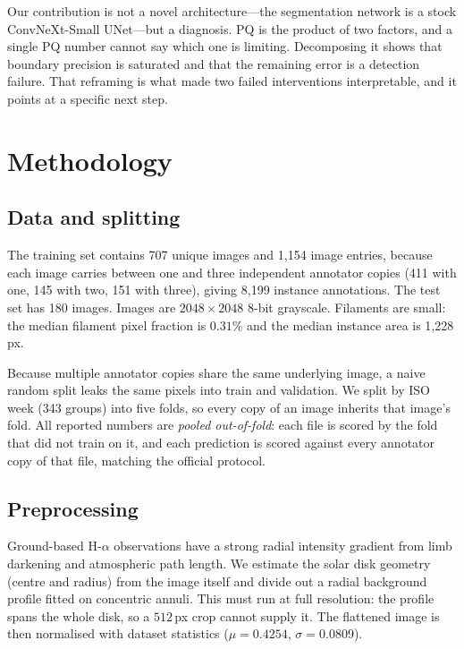 \documentclass[sigconf]{acmart}
\begin{document}
    Our contribution is not a novel architecture---the segmentation network is a stock ConvNeXt-Small UNet---but a diagnosis. PQ is the product of two factors, and a single PQ number cannot say which one is limiting. Decomposing it shows that boundary precision is saturated and that the remaining error is a detection failure. That reframing is what made two failed interventions interpretable, and it points at a specific next step.


\section{Methodology}\label{sec:methodology}

\subsection{Data and splitting}
    The training set contains 707 unique images and 1{,}154 image entries, because each image carries between one and three independent annotator copies (411 with one, 145 with two, 151 with three), giving 8{,}199 instance annotations. The test set has 180 images. Images are $2048\times2048$ 8-bit grayscale. Filaments are small: the median filament pixel fraction is $0.31\%$ and the median instance area is 1{,}228\,px.

    Because multiple annotator copies share the same underlying image, a naive random split leaks the same pixels into train and validation. We split by ISO week (343 groups) into five folds, so every copy of an image inherits that image's fold. All reported numbers are \emph{pooled out-of-fold}: each file is scored by the fold that did not train on it, and each prediction is scored against every annotator copy of that file, matching the official protocol.

\subsection{Preprocessing}
    Ground-based H-$\alpha$ observations have a strong radial intensity gradient from limb darkening and atmospheric path length. We estimate the solar disk geometry (centre and radius) from the image itself and divide out a radial background profile fitted on concentric annuli. This must run at full resolution: the profile spans the whole disk, so a $512$\,px crop cannot supply it. The flattened image is then normalised with dataset statistics ($\mu=0.4254$, $\sigma=0.0809$).
\end{document}
